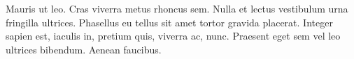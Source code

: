 {\sffamily
Mauris ut leo. Cras viverra metus rhoncus sem. Nulla et lectus vestibulum urna
fringilla ultrices. Phasellus eu tellus sit amet tortor gravida placerat.
Integer sapien est, iaculis in, pretium quis, viverra ac, nunc. Praesent eget
sem vel leo ultrices bibendum. Aenean faucibus.}
